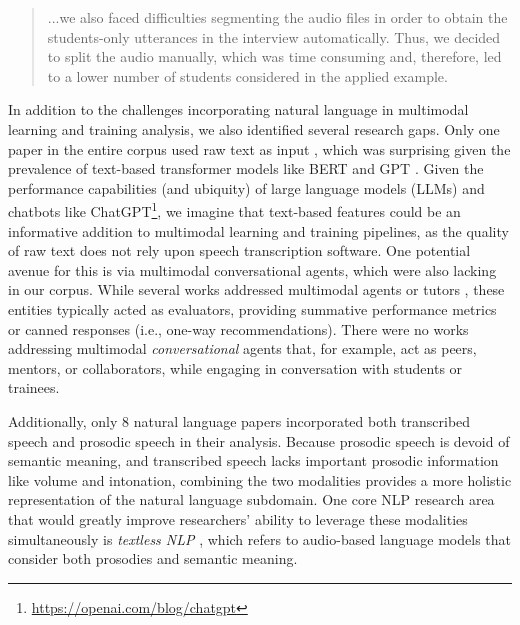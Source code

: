 \documentclass[manuscript,screen,review]{acmart}
\begin{document}
\begin{quote}
    ...we also faced difficulties segmenting the audio files in order to obtain the students-only utterances in the interview automatically. Thus, we decided to split the audio manually, which was time consuming and, therefore, led to a lower number of students considered in the applied example. \cite{32184286}
\end{quote}

In addition to the challenges incorporating natural language in multimodal learning and training analysis, we also identified several research gaps. Only one paper in the entire corpus used raw text as input \cite{666050348}, which was surprising given the prevalence of text-based transformer models like BERT \cite{devlin2018bert} and GPT \cite{radford2019language,brown2020language}. Given the performance capabilities (and ubiquity) of large language models (LLMs) and chatbots like ChatGPT\footnote{\href{https://openai.com/blog/chatgpt}{https://openai.com/blog/chatgpt}}, we imagine that text-based features could be an informative addition to multimodal learning and training pipelines, as the quality of raw text does not rely upon speech transcription software. One potential avenue for this is via multimodal conversational agents, which were also lacking in our corpus. While several works addressed multimodal agents or tutors \cite{3093310941,3783339081,1576545447}, these entities typically acted as evaluators, providing summative performance metrics or canned responses (i.e., one-way recommendations). There were no works addressing multimodal \textit{conversational} agents that, for example, act as peers, mentors, or collaborators, while engaging in conversation with students or trainees.

Additionally, only 8 natural language papers incorporated both transcribed speech and prosodic speech in their analysis. Because prosodic speech is devoid of semantic meaning, and transcribed speech lacks important prosodic information like volume and intonation, combining the two modalities provides a more holistic representation of the natural language subdomain. One core NLP research area that would greatly improve researchers' ability to leverage these modalities simultaneously is \textit{textless NLP} \cite{lakhotia2021generative}, which refers to audio-based language models that consider both prosodies and semantic meaning.
\end{document}
